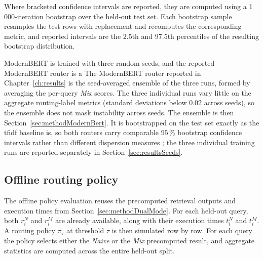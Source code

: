 \documentclass[english, bibtex]{kththesis}               %
\numberwithin{listing}{chapter}
\providecommand{\DIFaddtex}[1]{{\protect\color{blue} \sf #1}} %
\providecommand{\DIFdeltex}[1]{{\protect\color{red} \scriptsize #1}} %
\providecommand{\DIFaddbegin}{} %
\providecommand{\DIFaddend}{} %
\providecommand{\DIFdelbegin}{} %
\providecommand{\DIFdelend}{} %
\providecommand{\DIFadd}[1]{\texorpdfstring{\DIFaddtex{#1}}{#1}} %
\providecommand{\DIFdel}[1]{\texorpdfstring{\DIFdeltex{#1}}{}} %
\begin{document}
Where bracketed confidence intervals are reported, they are computed using a 1\,000-iteration bootstrap over the held-out test set. Each bootstrap sample resamples the test rows with replacement and recomputes the corresponding metric, and reported intervals are the 2.5th and 97.5th percentiles of the resulting bootstrap distribution.

\DIFdelbegin \DIFdel{ModernBERT is trained with three random seeds, and the reported ModernBERT router is a }\DIFdelend \DIFaddbegin \DIFadd{The ModernBERT router reported in Chapter~\ref{ch:results} is the }\DIFaddend seed-averaged ensemble of \DIFdelbegin \DIFdel{the three runs, formed by averaging the per-query \emph{Mix} scores. The three individual runs vary little on the aggregate routing-label metrics (standard deviations below $0.02$ across seeds), so the ensemble does not mask instability across seeds. The ensemble is then }\DIFdelend \DIFaddbegin \DIFadd{Section~\ref{sec:methodModernBert}. It is }\DIFaddend bootstrapped on the test set exactly as the \gls{tfidf} baseline is, so both routers carry comparable $95\,\%$ bootstrap confidence intervals rather than different dispersion measures\DIFaddbegin \DIFadd{; the three individual training runs are reported separately in Section~\ref{sec:resultsSeeds}}\DIFaddend .

\subsection{Offline routing policy}
\label{sec:methodOfflinePolicy}

The offline policy evaluation reuses the precomputed retrieval outputs and execution times from Section~\ref{sec:methodDualMode}. For each held-out query, both \(r_i^N\) and \(r_i^M\) are already available, along with their execution times \(t_i^N\) and \(t_i^M\). A routing policy \(\pi_\tau\) at threshold \(\tau\) is then simulated row by row. For each query the policy selects either the \emph{Naive} or the \emph{Mix} precomputed result, and aggregate statistics are computed across the entire held-out split.
\end{document}
